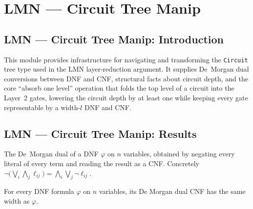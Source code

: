 \section{LMN --- Circuit Tree Manip}
\subsection*{LMN --- Circuit Tree Manip: Introduction}

This module provides infrastructure for navigating and transforming the \texttt{Circuit}
tree type used in the LMN layer-reduction argument. It supplies De~Morgan dual
conversions between DNF and CNF, structural facts about circuit depth, and the
core ``absorb one level'' operation that folds the top level of a circuit into the
Layer~2 gates, lowering the circuit depth by at least one while keeping every gate
representable by a width-$l$ DNF and CNF.

\subsection*{LMN --- Circuit Tree Manip: Results}

\begin{definition}
\label{DNF.dual}
\leanok
{}
The De~Morgan dual of a DNF $\varphi$ on $n$ variables, obtained by negating every
literal of every term and reading the result as a CNF. Concretely
$\neg\big(\bigvee_i \bigwedge_j \ell_{ij}\big) = \bigwedge_i \bigvee_j \neg\ell_{ij}$.
\end{definition}

\begin{lemma}
\label{DNF.dual_width}
\leanok
{}
For every DNF formula $\varphi$ on $n$ variables, its De Morgan dual CNF has the same
width as $\varphi$.
\end{lemma}

